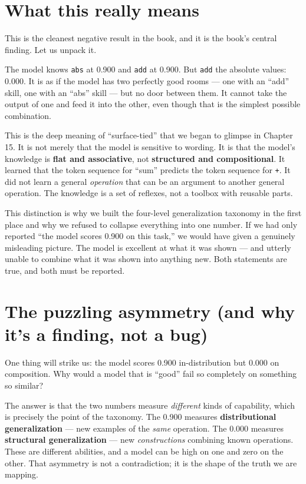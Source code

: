 \section{What this really means}\label{what-this-really-means}

This is the cleanest negative result in the book, and it is the book's
central finding. Let us unpack it.

The model knows \texttt{abs} at 0.900 and \texttt{add} at 0.900. But
\texttt{add} the absolute values: 0.000. It is as if the model has two
perfectly good rooms --- one with an ``add'' skill, one with an ``abs''
skill --- but no door between them. It cannot take the output of one and
feed it into the other, even though that is the simplest possible
combination.

This is the deep meaning of ``surface-tied'' that we began to glimpse in
Chapter 15. It is not merely that the model is sensitive to wording. It
is that the model's knowledge is \textbf{flat and associative}, not
\textbf{structured and compositional}. It learned that the token
sequence for ``sum'' predicts the token sequence for \texttt{+}. It did
not learn a general \emph{operation} that can be an argument to another
general operation. The knowledge is a set of reflexes, not a toolbox
with reusable parts.

This distinction is why we built the four-level generalization taxonomy
in the first place and why we refused to collapse everything into one
number. If we had only reported ``the model scores 0.900 on this task,''
we would have given a genuinely misleading picture. The model is
excellent at what it was shown --- and utterly unable to combine what it
was shown into anything new. Both statements are true, and both must be
reported.

\section{The puzzling asymmetry (and why it's a finding, not a
bug)}\label{the-puzzling-asymmetry-and-why-its-a-finding-not-a-bug}

One thing will strike us: the model scores 0.900 in-distribution but
0.000 on composition. Why would a model that is ``good'' fail so
completely on something so similar?

The answer is that the two numbers measure \emph{different} kinds of
capability, which is precisely the point of the taxonomy. The 0.900
measures \textbf{distributional generalization} --- new examples of the
\emph{same} operation. The 0.000 measures \textbf{structural
generalization} --- new \emph{constructions} combining known operations.
These are different abilities, and a model can be high on one and zero
on the other. That asymmetry is not a contradiction; it is the shape of
the truth we are mapping.

